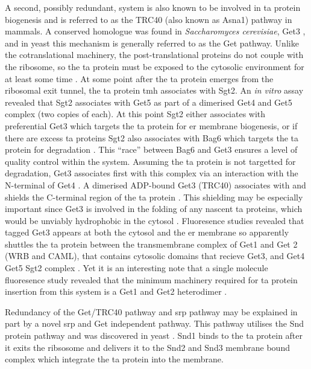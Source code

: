 A second, possibly redundant, system is also known to be involved in \gls{ta} protein biogenesis and is referred to as the TRC40 (also known as Asna1) pathway in mammals.
A conserved homologue was found in \textit{Saccharomyces cerevisiae}, Get3 \cite{Schuldiner2008}, and in yeast this mechanism is generally referred to as the Get pathway.
Unlike the cotranslational machinery, the post-translational proteins do not couple with the ribosome, so the \gls{ta} protein must be exposed to the cytosolic environment for at least some time \cite{Guna2018}.
At some point after the \gls{ta} protein emerges from the ribosomal exit tunnel, the \gls{ta} protein \gls{tmh} associates with Sgt2.
An \textit{in vitro} assay revealed that Sgt2 associates with Get5  \cite{Wang2010} as part of a dimerised Get4 and Get5 complex (two copies of each)\cite{Chang2010, Chang2012, Chartron2010, Chartron2012}.
At this point Sgt2 either associates with preferential Get3 which targets the \gls{ta} protein for \gls{er} membrane biogenesis, or if there are excess \gls{ta} proteins Sgt2 also associates with Bag6 which targets the \gls{ta} protein for degradation \cite{Shao2017}.
This ``race'' between Bag6 and Get3 ensures a level of quality control within the system.
Assuming the \gls{ta} protein is not targetted for degradation, Get3 associates first with this complex via an interaction with the N-terminal of Get4 \cite{Wang2010}.
A dimerised ADP-bound Get3 \cite{Mateja2009, Hu2009, Bozkurt2009, Suloway2009, Yamagata2009} (TRC40) associates with and shields the C-terminal region of the \gls{ta} protein \cite{Stefanovic2007, Schuldiner2008, Favaloro2008}.
This shielding may be especially important since Get3 is involved in the folding of any nascent \gls{ta} proteins, which would be unviably hydrophobic in the cytosol \cite{Jonikas2009}.
Fluoresence studies revealed that tagged Get3 appears at both the cytosol and the \gls{er} membrane so apparently shuttles the \gls{ta} protein between the transmembrane complex of Get1 and Get 2 (WRB and CAML), that contains cytosolic domains that recieve Get3, and Get4 Get5 Sgt2 complex \cite{Huh2003, Zalisko2017}.
Yet it is an interesting note that a single molecule fluoresence study revealed that the minimum machinery required for \gls{ta} protein insertion from this system is a Get1 and Get2 heterodimer \cite{Zalisko2017}.

Redundancy of the Get/TRC40 pathway and \gls{srp} pathway may be explained in part by a novel \gls{srp} and Get independent pathway.
This pathway utilises the Snd protein pathway and was discovered in yeast \cite{Aviram2016}.
Snd1 binds to the \gls{ta} protein after it exits the ribsosome and delivers it to the Snd2 and Snd3 membrane bound complex which integrate the \gls{ta} protein into the membrane.


